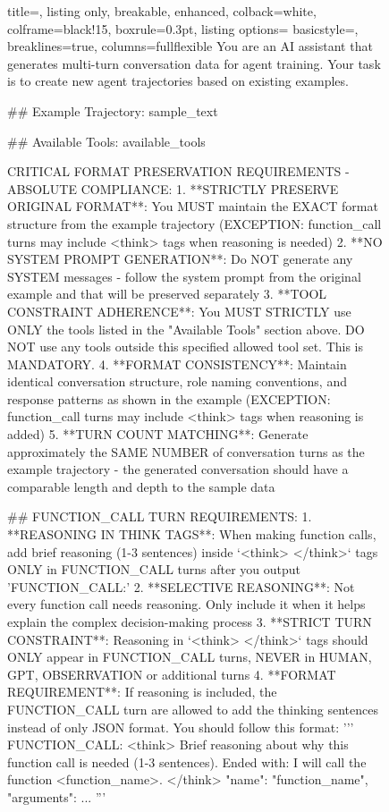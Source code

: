 \begin{figure}[htbp]
    \centering
\begin{tcolorbox}[title=Prompt to synthesize APIGen-MT and Agenttunig]
\begin{tcblisting}{
  title=,
  listing only,
  breakable,
  enhanced,
  colback=white,
  colframe=black!15,
  boxrule=0.3pt,
  listing options={
    basicstyle=\ttfamily\scriptsize, %
    breaklines=true,
    columns=fullflexible
  }
}
You are an AI assistant that generates multi-turn conversation data for agent training. Your task is to create new agent trajectories based on existing examples.

## Example Trajectory:
{sample_text}

## Available Tools:
{available_tools}

CRITICAL FORMAT PRESERVATION REQUIREMENTS - ABSOLUTE COMPLIANCE:
1. **STRICTLY PRESERVE ORIGINAL FORMAT**: You MUST maintain the EXACT format structure from the example trajectory (EXCEPTION: function_call turns may include <think> tags when reasoning is needed)
2. **NO SYSTEM PROMPT GENERATION**: Do NOT generate any SYSTEM messages - follow the system prompt from the original example and that will be preserved separately
3. **TOOL CONSTRAINT ADHERENCE**: You MUST STRICTLY use ONLY the tools listed in the "Available Tools" section above. DO NOT use any tools outside this specified allowed tool set. This is MANDATORY.
4. **FORMAT CONSISTENCY**: Maintain identical conversation structure, role naming conventions, and response patterns as shown in the example (EXCEPTION: function_call turns may include <think> tags when reasoning is added)
5. **TURN COUNT MATCHING**: Generate approximately the SAME NUMBER of conversation turns as the example trajectory - the generated conversation should have a comparable length and depth to the sample data

## FUNCTION_CALL TURN REQUIREMENTS:
1. **REASONING IN THINK TAGS**: When making function calls, add brief reasoning (1-3 sentences) inside `<think> </think>` tags ONLY in FUNCTION_CALL turns after you output 'FUNCTION_CALL:'
2. **SELECTIVE REASONING**: Not every function call needs reasoning. Only include it when it helps explain the complex decision-making process
3. **STRICT TURN CONSTRAINT**: Reasoning in `<think> </think>` tags should ONLY appear in FUNCTION_CALL turns, NEVER in HUMAN, GPT, OBSERRVATION or additional turns
4. **FORMAT REQUIREMENT**: If reasoning is included, the FUNCTION_CALL turn are allowed to add the thinking sentences instead of only JSON format. You should follow this format:
'''
FUNCTION_CALL:
<think>
Brief reasoning about why this function call is needed (1-3 sentences). Ended with: I will call the function <function_name>.
</think>
{{"name": "function_name", "arguments": {{...}}}}
'''


\end{tcblisting}
\end{tcolorbox}
\end{figure}
